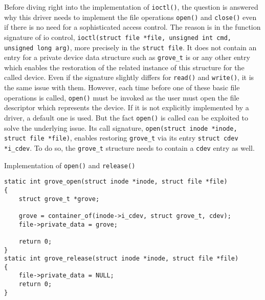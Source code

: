 Before diving right into the implementation of \texttt{ioctl()}, the question is answered why this driver needs to implement the file operations \texttt{open()} and \texttt{close()} even if there is no need for a sophisticated access control.
%
%
The reason is in the function signature of \ac{io} control, \texttt{ioctl(struct file *file, unsigned int cmd, unsigned long arg)}, more precisely in the \texttt{struct file}.
It does not contain an entry for a private device data structure such as \texttt{grove_t} is or any other entry which enables the restoration of the related instance of this structure for the called device.
Even if the signature slightly differs for \texttt{read()} and \texttt{write()}, it is the same issue with them.
However, each time before one of these basic file operations is called, \texttt{open()} must be invoked as the user must open the file descriptor which represents the device.
If it is not explicitly implemented by a driver, a default one is used.
But the fact \texttt{open()} is called can be exploited to solve the underlying issue.
Its call signature, \texttt{open(struct inode *inode, struct file *file)}, enables restoring \texttt{grove\_t} via its entry \texttt{struct cdev *i\_cdev}.
To do so, the \texttt{grove\_t} structure needs to contain a \texttt{cdev} entry as well.
%
\begin{listing} [H]
    \caption{Implementation of \texttt{open()} and \texttt{release()}}
    \label{lst:open}
    \begin{verbatim}
static int grove_open(struct inode *inode, struct file *file)
{
    struct grove_t *grove;

    grove = container_of(inode->i_cdev, struct grove_t, cdev);
    file->private_data = grove;

    return 0;
}
static int grove_release(struct inode *inode, struct file *file)
{
    file->private_data = NULL;
    return 0;
}
    \end{verbatim}
\end{listing}
